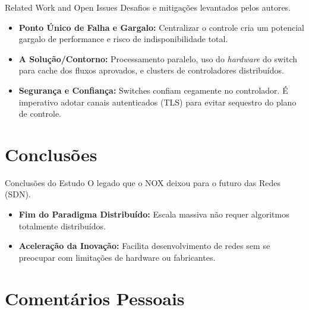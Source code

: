 \documentclass[aspectratio=169,xcolor=dvipsnames]{beamer}
\begin{document}
\begin{frame}{Related Work and Open Issues}
    Desafios e mitigações levantados pelos autores.
    
    \vspace{0.5cm}
    
    \begin{itemize}            
        \item \textbf{Ponto Único de Falha e Gargalo:} Centralizar o controle cria um potencial gargalo de performance e risco de indisponibilidade total.
        \item \textbf{A Solução/Contorno:} Processamento paralelo, uso do \textit{hardware} do switch para cache dos fluxos aprovados, e clusters de controladores distribuídos.
        \item \textbf{Segurança e Confiança:} Switches confiam cegamente no controlador. É imperativo adotar canais autenticados (TLS) para evitar sequestro do plano de controle.
    \end{itemize}
\end{frame}

\section{Conclusões}

\begin{frame}{Conclusões do Estudo}
    O legado que o NOX deixou para o futuro das Redes (SDN).
    
    \vspace{0.5cm}
    
    \begin{itemize}            
        \item \textbf{Fim do Paradigma Distribuído:} Escala massiva não requer algoritmos totalmente distribuídos.
        \item \textbf{Aceleração da Inovação:} Facilita desenvolvimento de redes sem se preocupar com limitações de hardware ou fabricantes.
    \end{itemize}
    
    \vspace{0.3cm}
\end{frame}

\section{Comentários Pessoais}
\end{document}
